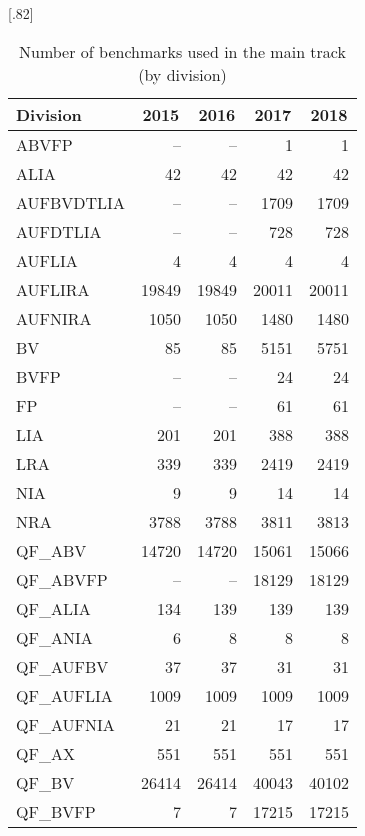 \documentclass[twoside,11pt]{article}
\begin{document}
\begin{table}
  \caption{Number of benchmarks used in the main track (by division)}
  \label{table:benchmarks-main-track}
  \centering
  \scalebox{.9}[.82]{\begin{tabular}{|l|r|r|r|r|}
    \hline
    Division & \multicolumn{1}{c|}{2015} & \multicolumn{1}{c|}{2016} & \multicolumn{1}{c|}{2017} & \multicolumn{1}{c|}{2018} \\
    \hline
    ABVFP      &     -- &     -- &      1 &     1 \\
    ALIA       &     42 &     42 &     42 &    42 \\
    AUFBVDTLIA &     -- &     -- &   1709 &  1709 \\
    AUFDTLIA   &     -- &     -- &    728 &   728 \\
    AUFLIA     &      4 &      4 &      4 &     4 \\
    AUFLIRA    &  19849 &  19849 &  20011 & 20011 \\
    AUFNIRA    &   1050 &   1050 &   1480 &  1480 \\
    BV         &     85 &     85 &   5151 &  5751 \\
    BVFP       &     -- &     -- &     24 &    24 \\
    FP         &     -- &     -- &     61 &    61 \\
    LIA        &    201 &    201 &    388 &   388 \\
    LRA        &    339 &    339 &   2419 &  2419 \\
    NIA        &      9 &      9 &     14 &    14 \\
    NRA        &   3788 &   3788 &   3811 &  3813 \\
    QF\_ABV    &  14720 &  14720 &  15061 & 15066 \\
    QF\_ABVFP  &     -- &     -- &  18129 & 18129 \\
    QF\_ALIA   &    134 &    139 &    139 &   139 \\
    QF\_ANIA   &      6 &      8 &      8 &     8 \\
    QF\_AUFBV  &     37 &     37 &     31 &    31 \\
    QF\_AUFLIA &   1009 &   1009 &   1009 &  1009 \\
    QF\_AUFNIA &     21 &     21 &     17 &    17 \\
    QF\_AX     &    551 &    551 &    551 &   551 \\
    QF\_BV     &  26414 &  26414 &  40043 & 40102 \\
    QF\_BVFP   &      7 &      7 &  17215 & 17215 \\

\end{tabular}}
\end{table}
\end{document}
